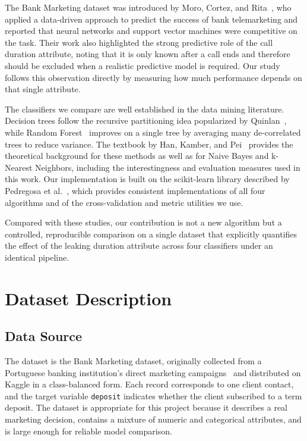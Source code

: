 \documentclass[conference]{IEEEtran}
\begin{document}
	The Bank Marketing dataset was introduced by Moro, Cortez, and
	Rita~\cite{b_moro}, who applied a data-driven approach to predict the success
	of bank telemarketing and reported that neural networks and support vector
	machines were competitive on the task. Their work also highlighted the strong
	predictive role of the call duration attribute, noting that it is only known
	after a call ends and therefore should be excluded when a realistic predictive
	model is required. Our study follows this observation directly by measuring how
	much performance depends on that single attribute.

	The classifiers we compare are well established in the data mining literature.
	Decision trees follow the recursive partitioning idea popularized by
	Quinlan~\cite{b_quinlan}, while Random Forest~\cite{b_breiman} improves on a
	single tree by averaging many de-correlated trees to reduce variance. The
	textbook by Han, Kamber, and Pei~\cite{b_han} provides the theoretical
	background for these methods as well as for Naive Bayes and k-Nearest
	Neighbors, including the interestingness and evaluation measures used in this
	work. Our implementation is built on the scikit-learn library described by
	Pedregosa et al.~\cite{b_sklearn}, which provides consistent implementations of
	all four algorithms and of the cross-validation and metric utilities we use.

	Compared with these studies, our contribution is not a new algorithm but a
	controlled, reproducible comparison on a single dataset that explicitly
	quantifies the effect of the leaking duration attribute across four classifiers
	under an identical pipeline.

	\section{Dataset Description}
	\label{sec:dataset}

	\subsection{Data Source}
	The dataset is the Bank Marketing dataset, originally collected from a
	Portuguese banking institution's direct marketing campaigns~\cite{b_moro} and
	distributed on Kaggle in a class-balanced form. Each record corresponds to one
	client contact, and the target variable \texttt{deposit} indicates whether the
	client subscribed to a term deposit. The dataset is appropriate for this
	project because it describes a real marketing decision, contains a mixture of
	numeric and categorical attributes, and is large enough for reliable
	model comparison.
\end{document}
